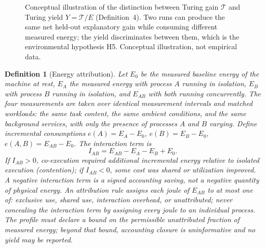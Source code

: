 \documentclass[11pt]{article}
\newtheorem{definition}{Definition}
\begin{document}
\begin{figure}[htbp]
\centering
{}
\caption{Conceptual illustration of the distinction between Turing gain $\mathcal{T}$ and Turing yield $Y=\mathcal{T}/E$ (Definition~4). Two runs can produce the same net held-out explanatory gain while consuming different measured energy; the yield discriminates between them, which is the environmental hypothesis H5. Conceptual illustration, not empirical data.}
\label{fig:yield}
\end{figure}


\begin{definition}[Energy attribution]
Let \(E_0\) be the measured baseline energy of the machine at rest, \(E_A\) the measured energy with process \(A\) running in isolation, \(E_B\) with process \(B\) running in isolation, and \(E_{AB}\) with both running concurrently. The four measurements are taken over identical measurement intervals and matched workloads: the same task content, the same ambient conditions, and the same background services, with only the presence of processes \(A\) and \(B\) varying. Define incremental consumptions \(e(A)=E_A-E_0\), \(e(B)=E_B-E_0\), \(e(A,B)=E_{AB}-E_0\). The interaction term is
\[
\boxed{
I_{AB}
=
E_{AB}-E_A-E_B+E_0.
}
\]
If \(I_{AB}>0\), co-execution required additional incremental energy relative to isolated execution (contention); if \(I_{AB}<0\), some cost was shared or utilization improved. A negative interaction term is a signed accounting saving, not a negative quantity of physical energy. An attribution rule assigns each joule of \(E_{AB}\) to at most one of: exclusive use, shared use, interaction overhead, or unattributed; never concealing the interaction term by assigning every joule to an individual process. The profile must declare a bound on the permissible unattributed fraction of measured energy; beyond that bound, accounting closure is uninformative and no yield may be reported.
\end{definition}
\end{document}
